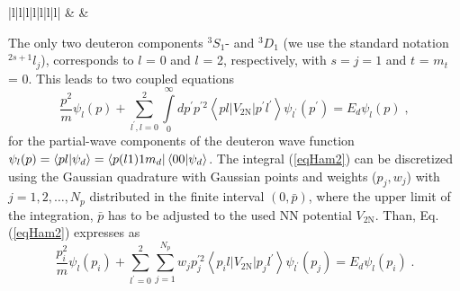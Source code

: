 \begin{table}[]
\begin{tabular}{|l|l|l|l|l|l|l|}
&
&      \\ \hline
\end{tabular}
\caption{The deuteron binding energy $E_{d}$ with the statistical uncertainty (see text in Chapter~\ref{statistical}) obtained with various NN interactions.}
\label{tabgs}
\end{table}
The only two deuteron components $^{3}S_{1}$- and $^{3}D_{1}$ (we use the standard notation $^{2s+1}l_{j}$), corresponds to $l$ = 0 and $l$ = 2, respectively, with $s = j = 1$ and $t$ = $m_{t}$ = 0. This leads to two coupled equations
\begin{equation}
\frac{p^{2}}{m}\psi_{l}(p)
+ \sum\limits_{l^{\prime}, l = 0}^{2}\int\limits_{0}^{\infty} dp^{\prime}p^{\prime 2}\left<p l|V_{\mathrm{2N}}|p^{\prime}l^{\prime}\right> \psi_{l^{\prime}}(p^{\prime}) = E_{d}\psi_{l}(p)\;,
\label{eqHam2}
\end{equation}
for the partial-wave components of the deuteron wave function $\psi_{l}(p) = \braket{pl}{\psi_{d}} = \bra{p(l1)1m_{d}}\braket{00}{\psi_{d}}$.
The integral (\ref{eqHam2}) can be discretized using the Gaussian quadrature with Gaussian points and weights ($p_{j}, w_{j}$) with $j = 1, 2, \ldots, N_{p}$ distributed in the finite interval $(0, \bar{p})$, where the upper limit of the integration, $\bar{p}$ has to be adjusted to the used NN potential $V_{\mathrm{2N}}$. Than, Eq. (\ref{eqHam2}) expresses as
\begin{equation}
\frac{p^{2}_{i}}{m}\psi_{l}(p_{i})
+ \sum\limits_{l^{\prime} = 0}^{2}\sum\limits_{j = 1}^{N_{p}} w_{j}p^{\prime 2}_{j}\left<p_{i} l|V_{\mathrm{2N}}|p_{j}l^{\prime}\right> \psi_{l^{\prime}}(p_{j}) = E_{d}\psi_{l}(p_{i})\;.
\label{eqHam3}
\end{equation}
